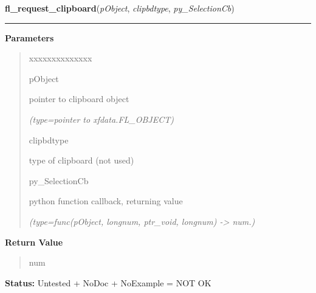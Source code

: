     \vspace{0.5ex}

\hspace{.8\funcindent}\begin{boxedminipage}{\funcwidth}

    \raggedright \textbf{fl\_request\_clipboard}(\textit{pObject}, \textit{clipbdtype}, \textit{py\_SelectionCb})

    \vspace{-1.5ex}

    \rule{\textwidth}{0.5\fboxrule}
\setlength{\parskip}{2ex}
\setlength{\parskip}{1ex}
      \textbf{Parameters}
      \vspace{-1ex}

      \begin{quote}
        \begin{Ventry}{xxxxxxxxxxxxxx}

          \item[pObject]

          pointer to clipboard object

            {\it (type=pointer to xfdata.FL\_OBJECT)}

          \item[clipbdtype]

          type of clipboard (not used)

          \item[py\_SelectionCb]

          python function callback, returning value

            {\it (type=func(pObject, longnum, ptr\_void, longnum) -{\textgreater} num.)}

        \end{Ventry}

      \end{quote}

      \textbf{Return Value}
    \vspace{-1ex}

      \begin{quote}
      num

      \end{quote}

\textbf{Status:} Untested + NoDoc + NoExample = NOT OK



    \end{boxedminipage}

    \label{xformslib:library:fl_add_clock}


